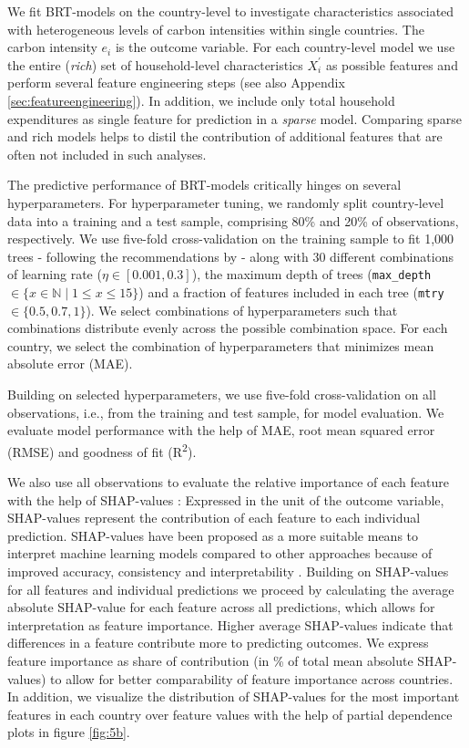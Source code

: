 \documentclass[12pt, a4paper]{article}
\begin{document}
We fit BRT-models on the country-level to investigate characteristics associated with heterogeneous levels of carbon intensities within single countries. The carbon intensity $e_{i}$ is the outcome variable. For each country-level model we use the entire (\textit{rich}) set of household-level characteristics $X_{i}^{'}$ as possible features and perform several feature engineering steps (see also Appendix \ref{sec:featureengineering}). In addition, we include only total household expenditures as single feature for prediction in a \textit{sparse} model. Comparing sparse and rich models helps to distil the contribution of additional features that are often not included in such analyses.

The predictive performance of BRT-models critically hinges on several hyperparameters. For hyperparameter tuning, we randomly split country-level data into a training and a test sample, comprising 80\% and 20\% of observations, respectively. We use five-fold cross-validation on the training sample to fit 1,000 trees - following the recommendations by \textcite{Elith.2008} - along with 30 different combinations of learning rate ($\eta \in [0.001,0.3]$), the maximum depth of trees (\texttt{max\_depth} $\in \{x \in \mathbb{N} \mid 1  \leq x \leq 15 \}$) and a fraction of features included in each tree (\texttt{mtry} $\in \{0.5,0.7,1\}$). We select combinations of hyperparameters such that combinations distribute evenly across the possible combination space. For each country, we select the combination of hyperparameters that minimizes mean absolute error (MAE).

Building on selected hyperparameters, we use five-fold cross-validation on all observations, i.e., from the training and test sample, for model evaluation. We evaluate model performance with the help of MAE, root mean squared error (RMSE) and goodness of fit (R\textsuperscript{2}). 

We also use all observations to evaluate the relative importance of each feature with the help of SHAP-values \autocite{Lundberg.2017}: Expressed in the unit of the outcome variable, SHAP-values represent the contribution of each feature to each individual prediction. SHAP-values have been proposed as a more suitable means to interpret machine learning models compared to other approaches because of improved accuracy, consistency and interpretability \autocite{Lundberg.2020}. Building on SHAP-values for all features and individual predictions we proceed by calculating the average absolute SHAP-value for each feature across all predictions, which allows for interpretation as feature importance. Higher average SHAP-values indicate that differences in a feature contribute more to predicting outcomes. We express feature importance as share of contribution (in \% of total mean absolute SHAP-values) to allow for better comparability of feature importance across countries. In addition, we visualize the distribution of SHAP-values for the most important features in each country over feature values with the help of partial dependence plots in figure \ref{fig:5b}. 
\end{document}
